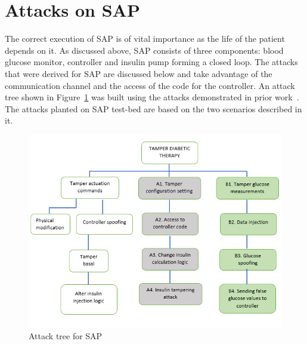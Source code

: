 \section{Attacks on \ac{SAP}}
The correct execution of \ac{SAP} is of vital importance as the life of the patient depends on it. As discussed above, \ac{SAP} consists of three components: blood glucose monitor, controller and insulin pump forming a closed loop. The attacks that were derived for \ac{SAP} are discussed below and take advantage of the communication channel and the access of the code for the controller. An attack tree shown in Figure~\ref{fig:attackTreeOpenAPS} was built using the attacks demonstrated in prior work~\cite{aliabadi2017artinali, radcliffe2011hacking}. The attacks planted on \ac{SAP} test-bed are based on the two scenarios described in it.
\begin{figure}[ht]
    \centering
    \includegraphics[scale=0.75,keepaspectratio = true]{Graphics/AttackTreeSAPNew.png}
    \caption{Attack tree for SAP}
    \label{fig:attackTreeOpenAPS}
\end{figure}

